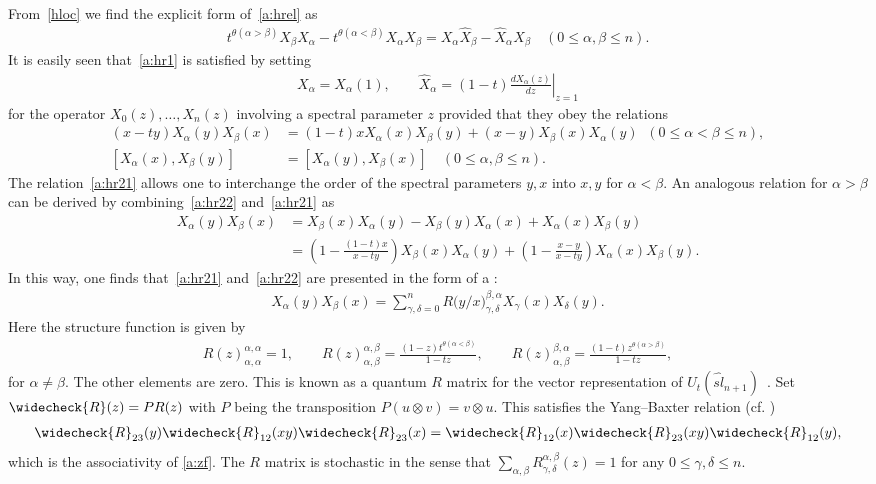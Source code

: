From~\eqref{hloc} we find the explicit form of~\eqref{a:hrel} as
\begin{align}\label{a:hr1}
t^{\theta(\alpha>\beta)}X_\beta X_\alpha 
-t^{\theta(\alpha<\beta)}X_\alpha X_\beta = 
X_\alpha \widehat{X}_\beta - \widehat{X}_\alpha X_\beta \quad (0 \le \alpha, \beta \le n).
\end{align}
It is easily seen that~\eqref{a:hr1} is satisfied by setting 
\begin{align}
X_\alpha = X_\alpha(1),\qquad 
\widehat{X}_\alpha = (1-t)\left. \frac{dX_\alpha(z)}{dz}\right\rvert_{z=1}
\end{align}
for the operator 
$X_0(z), \ldots, X_n(z)$ involving a spectral parameter $z$ 
provided that they obey the relations
\begin{align}
(x-ty)X_\alpha(y)X_\beta(x) &= (1-t) xX_\alpha(x)X_\beta(y) + (x-y) X_\beta(x)X_\alpha(y)
\;\; (0 \le \alpha < \beta \le n),
\label{a:hr21}
\\
[X_\alpha(x), X_\beta(y)] &= [X_\alpha(y), X_\beta(x)]\quad (0 \le \alpha, \beta \le n).
\label{a:hr22}
\end{align}
The relation~\eqref{a:hr21} allows one to interchange the order of 
the spectral parameters $y, x$ into $x,y$ for $\alpha<\beta$.
An analogous relation for $\alpha>\beta$ can be derived 
by combining~\eqref{a:hr22} and~\eqref{a:hr21} as 
\begin{align*}
X_\alpha(y)X_\beta(x) &= X_\beta(x)X_\alpha(y)-X_\beta(y)X_\alpha(x) 
+ X_\alpha(x)X_\beta(y)
\\
&=\left(1-\frac{(1-t)x}{x-ty}\right)X_\beta(x)X_\alpha(y) + 
\left(1-\frac{x-y}{x-ty}\right)X_\alpha(x)X_\beta(y).
\end{align*} 
In this way, one finds that~\eqref{a:hr21} and~\eqref{a:hr22} are presented in the form of a 
:
\begin{align}\label{a:zf}
X_\alpha(y)X_\beta(x) = \sum_{\gamma, \delta=0}^n
R\bigl(y/x\bigr)^{\beta,\alpha}_{\gamma,\delta}X_\gamma(x)X_\delta(y).
\end{align}
Here the structure function is given by 
\begin{align}\label{a:rmat}
R(z)^{\alpha, \alpha}_{\alpha, \alpha} = 1,
\qquad
R(z)^{\alpha, \beta}_{\alpha, \beta} = \frac{(1-z)t^{\theta(\alpha<\beta)}}{1-tz},
\qquad
R(z)^{\beta,\alpha}_{\alpha, \beta} = \frac{(1-t)z^{\theta(\alpha>\beta)}}{1-tz},
\end{align}
for $\alpha \neq \beta$.
The other elements are zero.
This is known as a quantum $R$ matrix for the vector representation of $U_t(\widehat{sl}_{n+1})$~\cite{D86,J1}.
Set  $\widecheck{R}(z) = P R(z)$ with $P$ being the transposition $P(u \otimes v) = v \otimes u$.
This satisfies the Yang--Baxter relation (cf. \cite{Bax})
\begin{align}\label{a:ybR}
\widecheck{R}_{23}(y)\widecheck{R}_{12}(xy)\widecheck{R}_{23}(x) 
= \widecheck{R}_{12}(x)\widecheck{R}_{23}(xy)\widecheck{R}_{12}(y),
\end{align}
which is the associativity of \eqref{a:zf}.
The $R$ matrix is stochastic in the sense that 
$\sum_{\alpha, \beta}R^{\alpha, \beta}_{\gamma,\delta}(z)=1$ for any $0 \le \gamma, \delta \le n$.


